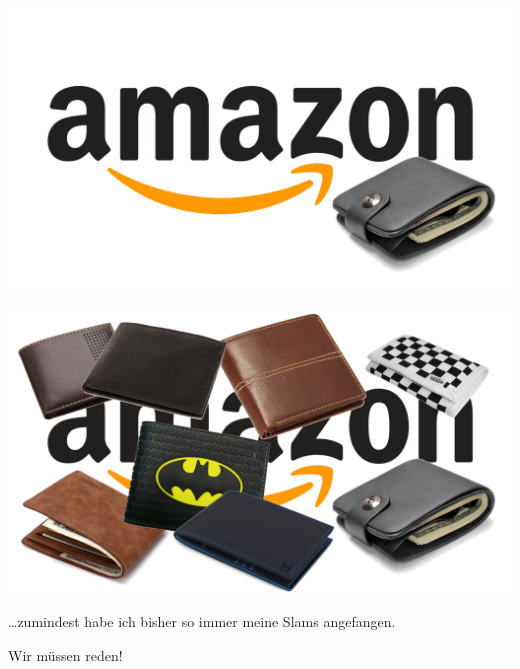 \documentclass[aspectratio=43,x11names]{beamer}
\begin{document}
\begin{frame}
\begin{center}
\includegraphics[width=\textwidth]{images/amazon-one-wallet.jpg} 
\end{center}
\end{frame}

\begin{frame}
\begin{center}
\includegraphics[width=\textwidth]{images/amazon-buncha-wallets.jpg} 
\end{center}
\end{frame}


\begin{frame}

\begin{center}
\dots zumindest habe ich bisher so immer meine Slams angefangen.
\pause\bigskip

Wir müssen reden!
\end{center}

\end{frame}
\end{document}
